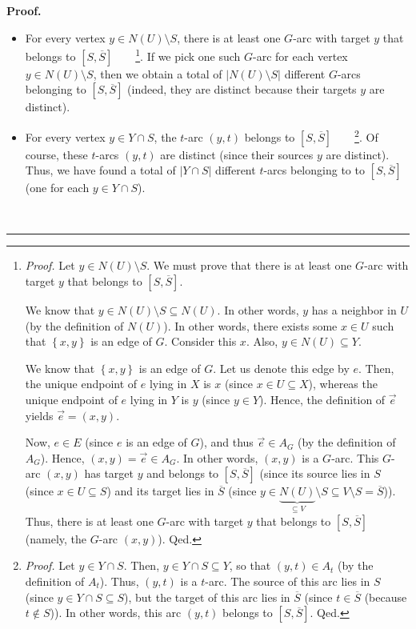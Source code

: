 \documentclass[numbers=enddot,12pt,final,onecolumn,notitlepage]{scrartcl}%
\theoremstyle{definition}
\newenvironment{proof}[1][Proof]{\noindent\textbf{#1.} }{\ \rule{0.5em}{0.5em}}
\begin{document}
\begin{proof}
\begin{itemize}
\item For every vertex $y\in N\left(  U\right)  \setminus S$, there is at
least one $G$-arc with target $y$ that belongs to $\left[  S,\overline
{S}\right]  $\ \ \ \ \footnote{\textit{Proof.} Let $y\in N\left(  U\right)
\setminus S$. We must prove that there is at least one $G$-arc with target $y$
that belongs to $\left[  S,\overline{S}\right]  $.
\par
We know that $y\in N\left(  U\right)  \setminus S\subseteq N\left(  U\right)
$. In other words, $y$ has a neighbor in $U$ (by the definition of $N\left(
U\right)  $). In other words, there exists some $x\in U$ such that $\left\{
x,y\right\}  $ is an edge of $G$. Consider this $x$. Also, $y\in N\left(
U\right)  \subseteq Y$.
\par
We know that $\left\{  x,y\right\}  $ is an edge of $G$. Let us denote this
edge by $e$. Then, the unique endpoint of $e$ lying in $X$ is $x$ (since $x\in
U\subseteq X$), whereas the unique endpoint of $e$ lying in $Y$ is $y$ (since
$y\in Y$). Hence, the definition of $\overrightarrow{e}$ yields
$\overrightarrow{e}=\left(  x,y\right)  $.
\par
Now, $e\in E$ (since $e$ is an edge of $G$), and thus $\overrightarrow{e}\in
A_{G}$ (by the definition of $A_{G}$). Hence, $\left(  x,y\right)
=\overrightarrow{e}\in A_{G}$. In other words, $\left(  x,y\right)  $ is a
$G$-arc. This $G$-arc $\left(  x,y\right)  $ has target $y$ and belongs to
$\left[  S,\overline{S}\right]  $ (since its source lies in $S$ (since $x\in
U\subseteq S$) and its target lies in $\overline{S}$ (since $y\in
\underbrace{N\left(  U\right)  }_{\subseteq V}\setminus S\subseteq V\setminus
S=\overline{S}$)). Thus, there is at least one $G$-arc with target $y$ that
belongs to $\left[  S,\overline{S}\right]  $ (namely, the $G$-arc $\left(
x,y\right)  $). Qed.}. If we pick one such $G$-arc for each vertex $y\in
N\left(  U\right)  \setminus S$, then we obtain a total of $\left\vert
N\left(  U\right)  \setminus S\right\vert $ different $G$-arcs belonging to
$\left[  S,\overline{S}\right]  $ (indeed, they are distinct because their
targets $y$ are distinct).

\item For every vertex $y\in Y\cap S$, the $t$-arc $\left(  y,t\right)  $
belongs to $\left[  S,\overline{S}\right]  $\ \ \ \ \footnote{\textit{Proof.}
Let $y\in Y\cap S$. Then, $y\in Y\cap S\subseteq Y$, so that $\left(
y,t\right)  \in A_{t}$ (by the definition of $A_{t}$). Thus, $\left(
y,t\right)  $ is a $t$-arc. The source of this arc lies in $S$ (since $y\in
Y\cap S\subseteq S$), but the target of this arc lies in $\overline{S}$ (since
$t\in\overline{S}$ (because $t\notin S$)). In other words, this arc $\left(
y,t\right)  $ belongs to $\left[  S,\overline{S}\right]  $. Qed.}. Of course,
these $t$-arcs $\left(  y,t\right)  $ are distinct (since their sources $y$
are distinct). Thus, we have found a total of $\left\vert Y\cap S\right\vert $
different $t$-arcs belonging to to $\left[  S,\overline{S}\right]  $ (one for
each $y\in Y\cap S$).
\end{itemize}


\end{proof}
\end{document}
